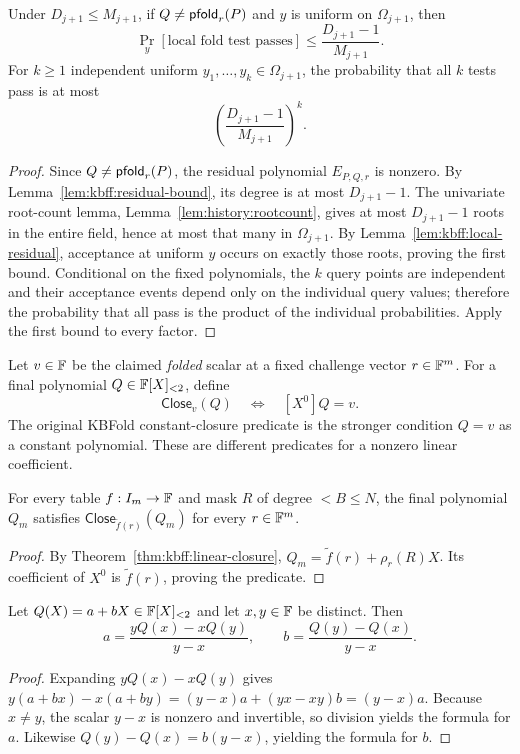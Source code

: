 \begin{theorem}\label{thm:kbff:local-detection}
Under $D_{j+1}\leq M_{j+1}$, if
$Q\neq\mathsf{pfold}_r(P)$ and $y$ is uniform on $\Omega_{j+1}$, then
\[
 \Pr_y[\text{local fold test passes}]
 \leq \frac{D_{j+1}-1}{M_{j+1}}.
\]
For $k\geq1$ independent uniform $y_1,\ldots,y_k\in\Omega_{j+1}$,
the probability that all $k$ tests pass is at most
\[
 \left(\frac{D_{j+1}-1}{M_{j+1}}\right)^k.
\]
\end{theorem}
\begin{proof}
Since $Q\neq\mathsf{pfold}_r(P)$, the residual polynomial
$E_{P,Q,r}$ is nonzero. By Lemma~\ref{lem:kbff:residual-bound},
its degree is at most $D_{j+1}-1$. The univariate root-count lemma,
Lemma~\ref{lem:history:rootcount}, gives at most $D_{j+1}-1$
roots in the entire field, hence at most that many in $\Omega_{j+1}$.
By Lemma~\ref{lem:kbff:local-residual}, acceptance at uniform $y$
occurs on exactly those roots, proving the first bound.
Conditional on the fixed polynomials, the $k$ query points are
independent and their acceptance events depend only on the
individual query values; therefore the probability that all pass is
the product of the individual probabilities. Apply the first bound
to every factor.
\end{proof}

\begin{definition}\label{def:kbff:linear-predicate}
Let $v\in\mathbb{F}$ be the claimed \emph{folded} scalar at a fixed challenge vector
$r\in\mathbb{F}^m$. For a final polynomial $Q\in\mathbb{F}[X]_{<2}$, define
\[
 \mathsf{Close}_{v}(Q)\quad\Longleftrightarrow\quad [X^0]Q=v.
\]
The original KBFold constant-closure predicate is the stronger
condition $Q=v$ as a constant polynomial. These are different
predicates for a nonzero linear coefficient.
\end{definition}

\begin{lemma}\label{lem:kbff:honest-closure}
For every table $f:I_m\to\mathbb{F}$ and mask $R$ of degree $<B\leq N$,
the final polynomial $Q_m$ satisfies
$\mathsf{Close}_{\widetilde f(r)}(Q_m)$ for every $r\in\mathbb{F}^m$.
\end{lemma}
\begin{proof}
By Theorem~\ref{thm:kbff:linear-closure},
$Q_m=\widetilde f(r)+\rho_r(R)X$. Its coefficient of $X^0$ is
$\widetilde f(r)$, proving the predicate.
\end{proof}

\begin{lemma}\label{lem:kbff:two-point-line}
Let $Q(X)=a+bX\in\mathbb{F}[X]_{<2}$ and let $x,y\in\mathbb{F}$ be distinct.
Then
\[
 a=\frac{yQ(x)-xQ(y)}{y-x},
 \qquad
 b=\frac{Q(y)-Q(x)}{y-x}.
\]
\end{lemma}
\begin{proof}
Expanding $yQ(x)-xQ(y)$ gives
$y(a+bx)-x(a+by)=(y-x)a+(yx-xy)b=(y-x)a$.
Because $x\neq y$, the scalar $y-x$ is nonzero and invertible,
so division yields the formula for $a$.
Likewise $Q(y)-Q(x)=b(y-x)$, yielding the formula for $b$.
\end{proof}

